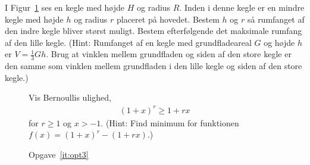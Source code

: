 \begin{enumerate}
 	\item \label{it:opt3} I Figur~\ref{fig:opt3} ses en kegle med højde $H$ og radius $R$. Inden i denne kegle er en mindre kegle med højde $h$ og radius $r$ placeret på hovedet. Bestem $h$ og $r$ så rumfanget af den indre kegle bliver størst muligt. Bestem efterfølgende det maksimale rumfang af den lille kegle. (Hint: Rumfanget af en kegle med grundfladeareal $G$ og højde $h$ er $V=\frac{1}{3}Gh$. Brug at vinklen mellem grundfladen og siden af den store kegle er den samme som vinklen mellem grundfladen i den lille kegle og siden af den store kegle.)
 \begin{figure}
 	\centering
 	\caption{Opgave~\ref{it:opt3}}
 	\label{fig:opt3}
 	
 	\item Vis Bernoullis ulighed,
 	\begin{align*}
 	(1+x)^r\geq 1+rx
 	\end{align*}
 	for $r\geq 1$ og $x>-1$. (Hint: Find minimum for funktionen $f(x)=(1+x)^r-(1+rx) $.)
 \end{figure}
\end{enumerate}